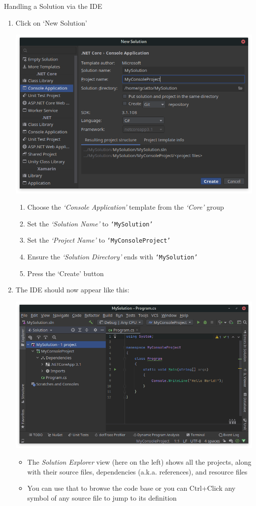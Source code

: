 \documentclass[presentation]{beamer}
\begin{document}
\begin{frame}[allowframebreaks]{Handling a Solution via the IDE}
\begin{enumerate}
        \item Click on \alert{`New Solution'}
        \begin{center}
            \includegraphics[width=.6\linewidth]{img/rider-2.png}
        \end{center}
        \begin{enumerate}
            \item Choose the \emph{`Console Application'} template from the \emph{`\dotnet Core'} group
            \item Set the \emph{`Solution Name'} to \texttt{`MySolution'}
            \item Set the \emph{`Project Name'} to \texttt{`MyConsoleProject'}
            \item Ensure the \emph{`Solution Directory'} ends with \texttt{`MySolution'}
            \item Press the \alert{`Create'} button
        \end{enumerate}

        \framebreak

        \item The IDE should now appear like this:
        \begin{center}
            \includegraphics[width=.6\linewidth]{img/rider-3.png}
        \end{center}
        \begin{itemize}
            \item The \emph{Solution Explorer} view (here on the left) shows all the projects, along with their source files, dependencies (a.k.a. references), and resource files
            \item You can use that to browse the code base or you can \alert{Ctrl+Click} any symbol of any source file to jump to its definition
        \end{itemize}


\end{enumerate}
\end{frame}
\end{document}
